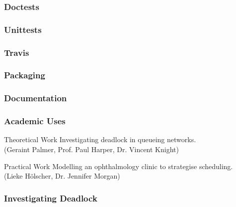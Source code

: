 \documentclass{beamer}
\begin{document}
\begin{frame}
\frametitle{Doctests}
\resizebox{\textwidth}{!}{%
%
}
\end{frame}

\begin{frame}
\frametitle{Unittests}
\resizebox{\textwidth}{!}{%
%
}
\end{frame}

\begin{frame}
\frametitle{Travis}
\end{frame}

\begin{frame}
\begin{figure}
    
\end{figure}
\end{frame}

\begin{frame}
\frametitle{Packaging}
\end{frame}

\begin{frame}
\begin{figure}
    
\end{figure}
\end{frame}

\begin{frame}
\frametitle{Documentation}
\end{frame}


\begin{frame}
\frametitle{Academic Uses}
\vfill
\begin{block}{Theoretical Work}
Investigating deadlock in queueing networks.\\
(Geraint Palmer, Prof. Paul Harper, Dr. Vincent Knight)
\end{block}
\vfill
\begin{block}{Practical Work}
Modelling an ophthalmology clinic to strategise scheduling.\\
(Lieke H\"{o}lscher, Dr. Jennifer Morgan)
\end{block}
\vfill
\end{frame}


\begin{frame}
\frametitle{Investigating Deadlock}
\begin{figure}
    
\end{figure}
\end{frame}
\end{document}
